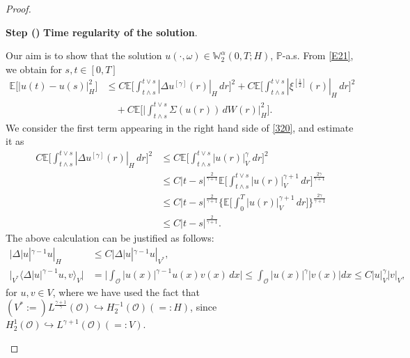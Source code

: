 \documentclass[english,a4paper,11pt]{amsart}
\theoremstyle{plain}
\theoremstyle{definition}
\theoremstyle{remark}
\numberwithin{equation}{section}
\newcounter{lil1}
\newenvironment{step}
{\begin{list} { \bf Step (\Roman{lil1})}
		{ \usecounter{lil1}
			\setlength{\leftmargin}{0.0cm}
			\setlength{\topsep}{0.2cm}
			\setlength{\itemsep}{0.0cm}
			\setlength{\parsep}{0.1cm}
			\setlength{\itemindent}{0.8cm}
			\setlength{\parskip}{0.0cm}}}
	{\end{list}}
\newcounter{lil33}
\newcounter{lil1q}
\newcommand{\EE}{ \mathbb{E} }
\renewcommand{\P}{\mathbb{P}}
\begin{document}
\begin{proof}
\begin{step}
\textbf{Time regularity of the solution}. {Our aim is to show that the solution $u(\cdot,\omega)\in \mathbb{W}^{\alpha}_2(0,T;H)$, $\P$-a.s. From \eqref{E21}, we obtain for $s,t\in[0,T]$
\begin{align}\label{320}\nonumber
\EE\big[	|u(t)-u(s)|_H^2\big]  & \leq 
	 C \EE \bigg[\int_{t\wedge s}^{t\vee s} |\Delta u^{[\gamma]}(r)|_{H}\,  dr \bigg]^2+C\EE\bigg[\int_{t\wedge s}^{t\vee s} |\xi^{[\frac{1}{2}]}(r)|_H\, d r\bigg]^2\\&\quad +C\EE\bigg[\bigg|\int_{t\wedge s}^{t\vee s}\Sigma(u(r))\, dW(r)\bigg|_{H}^2\bigg]. 
\end{align}We consider the first term appearing in the right hand side of \eqref{320}, and estimate it as 
\begin{align}\label{321}\nonumber
C	\EE \bigg[\int_{t\wedge s}^{t\vee s} |\Delta u^{[\gamma]}(r)|_{H}\,  dr \bigg]^2 & \leq C \EE\bigg[ \int_{t\wedge s}^{t\vee s} |u(r)|_V^\gamma \; dr \bigg]^2
\\&\nonumber \leq C |t-s|^{\frac{2}{\gamma+1}}\EE\bigg[\int_{t\wedge s}^{t\vee s} |u(r)|_V^{\gamma+1}\, dr \bigg]^{\frac{2\gamma}{\gamma+1}}
\\& \leq \nonumber C |t-s|^{\frac{2}{\gamma+1}}\bigg\{\EE\bigg[\int_0^T |u(r)|_V^{\gamma+1}\, dr \bigg]\bigg\}^{\frac{2\gamma }{\gamma+1}}
\\& \leq C |t-s|^{\frac{2}{\gamma+1}}. 
\end{align}The above calculation can be justified as follows: 
\begin{align*}
	|\Delta |u|^{\gamma-1}u|_{H} &\leq C| \Delta|u|^{\gamma-1}u|_{V^\ast},\\
	\big|_{V^\ast}\langle \Delta|u|^{\gamma-1}u,v\rangle_{V}\big| &=\bigg|\int_{\mathcal{O}} |u(x)|^{\gamma-1}u(x)v(x)\, dx\bigg|\leq \int_\mathcal{O} |u(x)|^{\gamma}|v(x)|dx \leq C |u|_{V}^\gamma |v|_{V},
\end{align*}for $u,v\in V$, where we have used the fact that  $(V^\ast:=)L^{\frac{\gamma+1}{\gamma}}(\mathcal{O}) \hookrightarrow H_2^{-1}(\mathcal{O})(=:H)$, since $H_2^{1}(\mathcal{O})\hookrightarrow L^{\gamma+1}(\mathcal{O})(=:V)$.

}
\end{step}
\end{proof}
\end{document}
